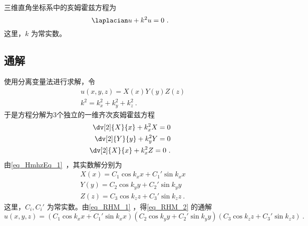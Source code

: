 

三维直角坐标系中的亥姆霍兹方程为
\begin{equation}\label{eq_RHM_2}
\laplacian u+k^2u=0~.
\end{equation}
这里，$k$ 为常实数。
\subsection{通解}
使用分离变量法进行求解，令
\begin{equation}\label{eq_RHM_1}
\begin{aligned}
&u(x,y,z)=X(x)Y(y)Z(z)\\
&k^2=k_x^2+k_y^2+k_z^2~.
\end{aligned}
\end{equation}
于是方程分解为3个独立的一维齐次亥姆霍兹方程
\begin{equation}
\begin{aligned}
\dv[2]{X}{x}+k_x^2X=0\\
\dv[2]{Y}{y}+k_y^2Y=0\\
\dv[2]{X}{x}+k_x^2Z=0~.
\end{aligned}
\end{equation}
由\autoref{eq_HmhzEq_1}~，其实数解分别为
\begin{equation}
\begin{aligned}
&X(x)=C_1\cos k_xx+C_1'\sin k_xx\\
&Y(y)=C_2\cos k_yy+C_2'\sin k_yy\\
&Z(z)=C_3\cos k_zz+C_3'\sin k_zz~.
\end{aligned}
\end{equation}
这里，$C_i,C_i'$ 为常实数。由\autoref{eq_RHM_1} ，得\autoref{eq_RHM_2} 的通解
\begin{equation}\label{eq_RHM_3}
u(x,y,z)=(C_1\cos k_xx+C_1'\sin k_xx)(C_2\cos k_yy+C_2'\sin k_yy)(C_3\cos k_zz+C_3'\sin k_zz)~.
\end{equation}

